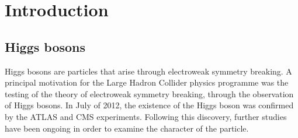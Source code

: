 \chapter*{Introduction}
\label{chapter:introduction}

\section{Higgs bosons}

Higgs bosons are particles that arise through electroweak symmetry breaking. A principal motivation for the Large Hadron Collider physics programme was the testing of the theory of electroweak symmetry breaking, through the observation of Higgs bosons. In July of 2012, the existence of the Higgs boson was confirmed by the ATLAS and CMS experiments. Following this discovery, further studies have been ongoing in order to examine the character of the particle.
